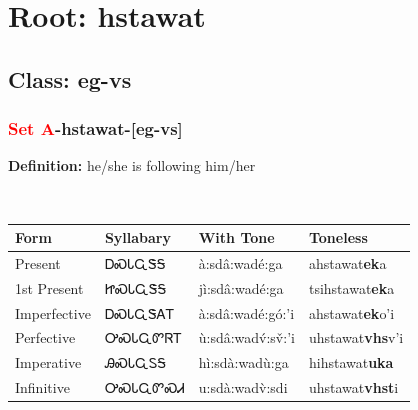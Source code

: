 \needspace{4in}
\section*{Root: hstawat}
\nopagebreak
{}
\needspace{3in}
\subsection*{Class: eg-vs}
\nopagebreak
\needspace{2in}
\subsubsection*{\textcolor{Red}{Set A}{-}\textbf{hstawat}{-}[eg-vs]}
\nopagebreak
\textbf{Definition: } he/she is following him/her
\\[0.5em]
\begin{tabularx}{\textwidth}{l X X X}%
\toprule%
\textbf{Form}&\textbf{Syllabary}&\textbf{With Tone}&\textbf{Toneless}\\%
\midrule%
Present&ᎠᏍᏓᏩᏕᎦ&à:sdâ:wadé:ga&ahstawat\textbf{ek}a\\%
1st Present&ᏥᏍᏓᏩᏕᎦ&jì:sdâ:wadé:ga&tsihstawat\textbf{ek}a\\%
Imperfective&ᎠᏍᏓᏩᏕᎪᎢ&à:sdâ:wadé:gó:’i&ahstawat\textbf{ek}o'i\\%
Perfective&ᎤᏍᏓᏩᏛᏒᎢ&ù:sdâ:wadv́:sv̌:’i&uhstawat\textbf{vhs}v'i\\%
Imperative&ᎯᏍᏓᏩᏚᎦ&hì:sdà:wadù:ga&hihstawat\textbf{uka}\\%
Infinitive&ᎤᏍᏓᏩᏛᏍᏗ&u:sdà:wadv̀:sdi&uhstawat\textbf{vhst}i\\%
\bottomrule%
\end{tabularx}
\\[1em]